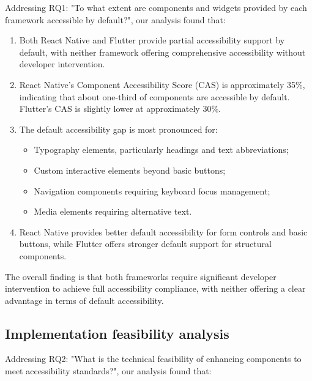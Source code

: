 Addressing RQ1: "To what extent are components and widgets provided by each framework accessible by default?", our analysis found that:

\begin{enumerate}
    \item Both React Native and Flutter provide partial accessibility support by default, with neither framework offering comprehensive accessibility without developer intervention.
    
    \item React Native's Component Accessibility Score (CAS) is approximately 35\%, indicating that about one-third of components are accessible by default. Flutter's CAS is slightly lower at approximately 30\%.
    
    \item The default accessibility gap is most pronounced for:
    \begin{itemize}
        \item Typography elements, particularly headings and text abbreviations;
        \item Custom interactive elements beyond basic buttons;
        \item Navigation components requiring keyboard focus management;
        \item Media elements requiring alternative text.
    \end{itemize}
    
    \item React Native provides better default accessibility for form controls and basic buttons, while Flutter offers stronger default support for structural components.
\end{enumerate}

The overall finding is that both frameworks require significant developer intervention to achieve full accessibility compliance, with neither offering a clear advantage in terms of default accessibility.

\subsection{Implementation feasibility analysis}
\label{subsec:implementation-feasibility}

Addressing RQ2: "What is the technical feasibility of enhancing components to meet accessibility standards?", our analysis found that:

